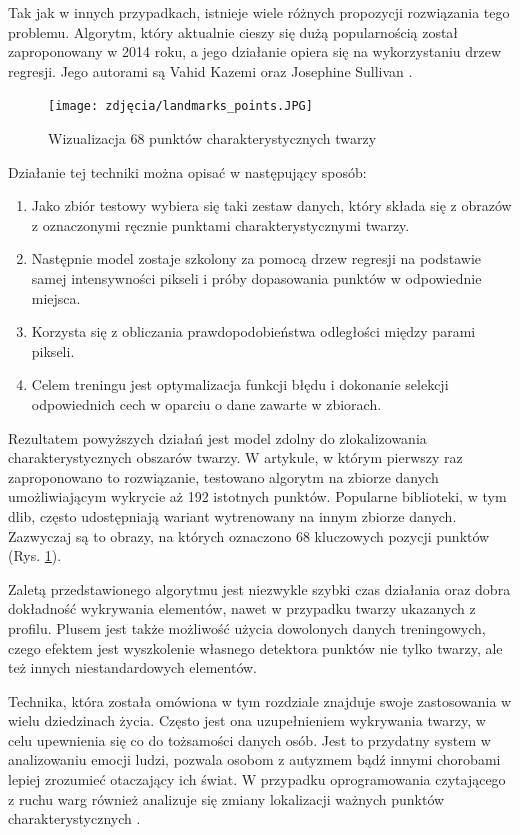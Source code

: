 Tak jak w innych przypadkach, istnieje wiele różnych propozycji rozwiązania tego problemu. Algorytm, który aktualnie cieszy się dużą popularnością został zaproponowany w 2014 roku, a jego działanie opiera się na wykorzystaniu drzew regresji. Jego autorami są Vahid Kazemi oraz Josephine Sullivan \cite{landmarks}. 

\begin{figure}[h]
	\centering
	\texttt{[image: zdjęcia/landmarks\_points.JPG]}
	\caption{Wizualizacja 68 punktów charakterystycznych twarzy \cite{landmarksPoints}}
	\label{fig:landmarks}
\end{figure}

Działanie tej techniki można opisać w następujący sposób:
\begin{enumerate}
    \item Jako zbiór testowy wybiera się taki zestaw danych, który składa się z obrazów z oznaczonymi ręcznie punktami charakterystycznymi twarzy.
    \item Następnie model zostaje szkolony za pomocą drzew regresji na podstawie samej intensywności pikseli i próby dopasowania punktów w odpowiednie miejsca.
    \item  Korzysta się z obliczania prawdopodobieństwa odległości między parami pikseli.
    \item Celem treningu jest optymalizacja funkcji błędu i dokonanie selekcji odpowiednich cech w oparciu o dane zawarte w zbiorach.
\end{enumerate}

Rezultatem powyższych działań jest model zdolny do zlokalizowania charakterystycznych obszarów twarzy. W artykule, w którym pierwszy raz zaproponowano to rozwiązanie, testowano algorytm na zbiorze danych umożliwiającym wykrycie aż 192 istotnych punktów. Popularne biblioteki, w tym dlib, często udostępniają wariant wytrenowany na innym zbiorze danych. Zazwyczaj są to obrazy, na których oznaczono 68 kluczowych pozycji punktów (Rys. \ref{fig:landmarks}).

Zaletą przedstawionego algorytmu jest niezwykle szybki czas działania oraz dobra dokładność wykrywania elementów, nawet w przypadku twarzy ukazanych z profilu. Plusem jest także możliwość użycia dowolonych danych treningowych, czego efektem jest wyszkolenie własnego detektora punktów nie tylko twarzy, ale też innych niestandardowych elementów.

Technika, która została omówiona w tym rozdziale znajduje swoje zastosowania w wielu dziedzinach życia. Często jest ona uzupełnieniem wykrywania twarzy, w celu upewnienia się co do tożsamości danych osób. Jest to przydatny system w analizowaniu emocji ludzi, pozwala osobom z autyzmem bądź innymi chorobami lepiej zrozumieć otaczający ich świat. W przypadku oprogramowania czytającego z ruchu warg również analizuje się zmiany lokalizacji ważnych punktów charakterystycznych \cite{fDetection2}.

